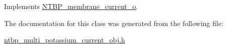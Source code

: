 Implements \hyperlink{class_n_t_b_p__membrane__current__o_a423b482d830c9c70098502114477c057}{NTBP\_\-membrane\_\-current\_\-o}.



The documentation for this class was generated from the following file:\begin{DoxyCompactItemize}
\item 
\hyperlink{ntbp__multi__potassium__current__obj_8h}{ntbp\_\-multi\_\-potassium\_\-current\_\-obj.h}\end{DoxyCompactItemize}
